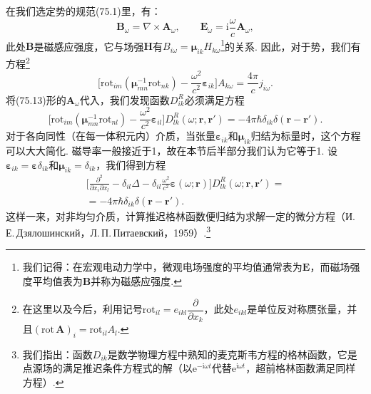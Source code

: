 在我们选定势的规范(75.1)里，有：
\begin{equation}
\bm{B}_{\omega}=\nabla\times\bm{A}_{\omega},\qquad\bm{E}_{\omega}=\mathrm{i}\frac{\omega}{c}\bm{A}_{\omega},
\end{equation}
此处$\bm{B}$是磁感应强度，它与场强$\bm{H}$有$B_{i\omega}=\bm{\mu}_{ik}H_{k\omega}$\footnote{我们记得：在宏观电动力学中，微观电场强度的平均值通常表为$\bm{E}$，而磁场强度平均值表为$\bm{B}$并称为磁感应强度.}的关系. 因此，对于势，我们有方程\footnote{在这里以及今后，利用记号$\mathrm{rot}_{il}=e_{ikl}\dfrac{\partial}{\partial x_k}$，此处$e_{ikl}$是单位反对称赝张量，并且$(\mathrm{rot}\,\bm{A})_i=\mathrm{rot}_{il}A_l$.}
\begin{equation*}
\bigl[\mathrm{rot}_{im}(\bm{\mu}_{mn}^{-1}\mathrm{rot}_{nk})-\frac{\omega^{2}}{c^{2}}\bm{\varepsilon}_{ik}\bigr]A_{k\omega}=\frac{4\pi}{c}j_{i\omega}.
\end{equation*}
将(75.13)形的$\bm{A}_{\omega}$代入，我们发现函数$D_{ik}^{R}$必须满足方程
\begin{equation}
\bigl[\mathrm{rot}_{im}(\bm{\mu}_{mn}^{-1}\mathrm{rot}_{nl})-\frac{\omega^{2}}{c^{2}}\bm{\varepsilon}_{il}\bigr]D_{lk}^{R}(\omega;\bm{r},\bm{r}')=-4\pi\hbar\delta_{ik}\delta(\bm{r}-\bm{r}').
\end{equation}
对于各向同性（在每一体积元内）介质，当张量$\bm{\varepsilon}_{ik}$和$\bm{\mu}_{ik}$归结为标量时，这个方程可以大大简化. 磁导率一般接近于1，故在本节后半部分我们认为它等于1. 设$\bm{\varepsilon}_{ik}=\bm{\varepsilon}\delta_{ik}$和$\bm{\mu}_{ik}=\delta_{ik}$，我们得到方程
\begin{equation}
\begin{aligned}
\biggl[\frac{\partial^{2}}{\partial x_{i}\partial x_{l}}-\delta_{il}\Delta-\delta_{il}\frac{\omega^{2}}{c^{2}}\bm{\varepsilon}(\omega;\bm{r})\biggr]D_{lk}^{R}(\omega;\bm{r},\bm{r}')={}\\
{}=-4\pi\hbar\delta_{ik}\delta(\bm{r}-\bm{r}').
\end{aligned}
\end{equation}
这样一来，对非均匀介质，计算推迟格林函数便归结为求解一定的微分方程（И.\,Е.\,Дзялошинский，Л.\,П.\,Питаевский，1959）.\footnote{我们指出：函数$D_{ik}$是数学物理方程中熟知的麦克斯韦方程的格林函数，它是点源场的满足推迟条件方程式的解（以$\mathrm{e}^{-\mathrm{i}\omega t}$代替$\mathrm{e}^{\mathrm{i}\omega t}$，超前格林函数满足同样方程）.}

